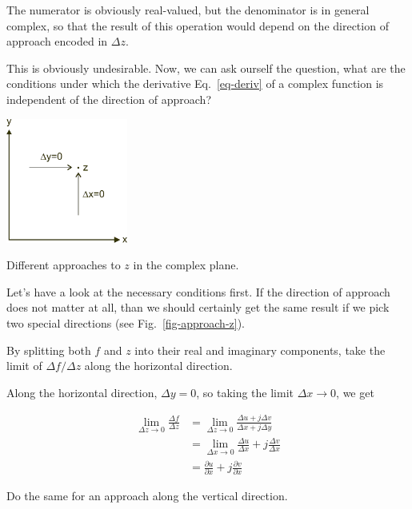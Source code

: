 The numerator is obviously real-valued, but the denominator is in general complex, so that the result of this operation would depend on the direction of approach encoded in $\Delta z$.

This is obviously undesirable. Now, we can ask ourself the question, what are the conditions under which the derivative Eq.~\ref{eq-deriv} of a complex function is independent of the direction of approach?

\begin{marginfigure}[-2cm]
\includegraphics[width=4cm]{complex/figures/approach_z}
\caption{Different approaches to $z$ in the complex plane.}
\label{fig-approach-z}
\end{marginfigure}

Let's have a look at the necessary conditions first. If the direction of approach does not matter at all, than we should certainly get the same result if we pick two special directions (see Fig.~\ref{fig-approach-z}).

\begin{cue}
 By splitting both $f$ and $z$ into their real and imaginary components, take the limit of $\Delta f / \Delta z$ along the horizontal direction.
\end{cue}

Along the horizontal direction, $\Delta y = 0$, so taking the limit $\Delta x \to 0$, we get

\begin{align}
\lim_{\Delta z \to 0} \frac{\Delta f}{\Delta z}
& = \lim_{\Delta z \to 0} \frac{\Delta u + j \Delta v}{\Delta x + j \Delta y}
\nonumber \\
& = \lim_{\Delta x \to 0} \frac{\Delta u}{\Delta x} + j \frac{\Delta v}{\Delta
x} \nonumber \\
& = \frac{\partial u}{\partial x} + j \frac{\partial v}{\partial
x}\label{eq-deriv-dx}
\end{align} 

\begin{cue}
Do the same for an approach along the vertical direction.
\end{cue}

